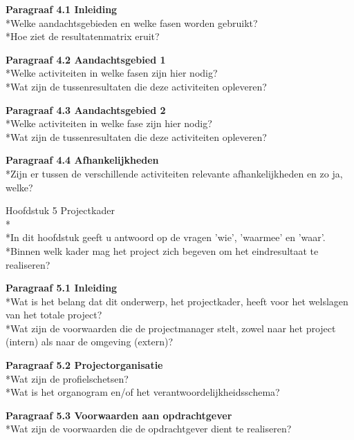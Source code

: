 \documentclass{article}
\begin{document}
\noindent
\textbf{Paragraaf 4.1 Inleiding}
\\*Welke aandachtsgebieden en welke fasen worden gebruikt?
\\*Hoe ziet de resultatenmatrix eruit?
\newline

\noindent
\textbf{Paragraaf 4.2 Aandachtsgebied 1}
\\*Welke activiteiten in welke fasen zijn hier nodig?
\\*Wat zijn de tussenresultaten die deze activiteiten opleveren?
\newline

\noindent
\textbf{Paragraaf 4.3 Aandachtsgebied 2}
\\*Welke activiteiten in welke fase zijn hier nodig?
\\*Wat zijn de tussenresultaten die deze activiteiten opleveren?
\newline

\noindent
\textbf{Paragraaf 4.4 Afhankelijkheden}
\\*Zijn er tussen de verschillende activiteiten relevante afhankelijkheden en zo ja, welke?
\newline
\newline

Hoofdstuk 5 Projectkader
\\*
\\*In dit hoofdstuk geeft u antwoord op de vragen 'wie', 'waarmee' en 'waar'.
\\*Binnen welk kader mag het project zich begeven om het eindresultaat te realiseren?
\newline

\noindent
\textbf{Paragraaf 5.1 Inleiding}
\\*Wat is het belang dat dit onderwerp, het projectkader, heeft voor het welslagen van het totale project?
\\*Wat zijn de voorwaarden die de projectmanager stelt, zowel naar het project (intern) als naar de omgeving (extern)?
\newline

\noindent
\textbf{Paragraaf 5.2 Projectorganisatie}
\\*Wat zijn de profielschetsen?
\\*Wat is het organogram en/of het verantwoordelijkheidsschema?
\newline

\noindent
\textbf{Paragraaf 5.3 Voorwaarden aan opdrachtgever}
\\*Wat zijn de voorwaarden die de opdrachtgever dient te realiseren?
\newline
\end{document}
